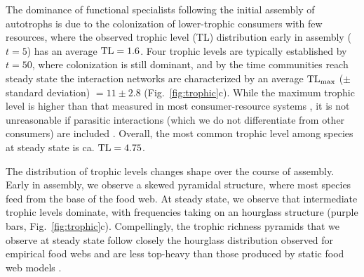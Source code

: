 \documentclass[twocolumn,preprintnumbers,amsmath,amssymb,superscriptaddress,linenumbers]{revtex4-1}
\begin{document}
The dominance of functional specialists following the initial assembly of autotrophs is due to the colonization of lower-trophic consumers with few resources, where the observed trophic level (TL) distribution early in assembly ($t=5$) has an average ${\rm TL}=1.6$.
Four trophic levels are typically established by $t=50$, where colonization is still dominant, and by the time communities reach steady state the interaction networks are characterized by an average ${\rm TL_{max}}$ ($\pm$ standard deviation) $=11 \pm 2.8$ (Fig.\ \ref{fig:trophic}c).
While the maximum trophic level is higher than that measured in most consumer-resource systems \cite{Williams2002}, it is not unreasonable if parasitic interactions (which we do not differentiate from other consumers) are included \cite{Lafferty2006}.
Overall, the most common trophic level among species at steady state is ca. ${\rm TL}=4.75$. %

The distribution of trophic levels changes shape over the course of assembly.
Early in assembly, we observe a skewed pyramidal structure, where most species feed from the base of the food web.
At steady state, we observe that intermediate trophic levels dominate, with frequencies taking on an hourglass structure (purple bars, Fig.\ \ref{fig:trophic}c).
Compellingly, the trophic richness pyramids that we observe at steady state follow closely the hourglass distribution observed for empirical food webs and are less top-heavy than those produced by static food web models \cite{Turney2016}.\\







\end{document}
